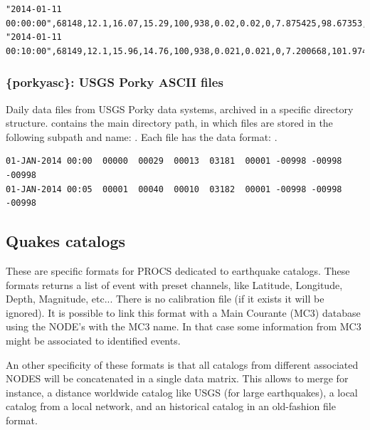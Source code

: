 \begin{lstlisting}[language={},title=Campbell T0A5 format example]
"2014-01-11 00:00:00",68148,12.1,16.07,15.29,100,938,0.02,0.02,0,7.875425,98.67353,10.86884,0,0,0,0,0,0,0,0
"2014-01-11 00:10:00",68149,12.1,15.96,14.76,100,938,0.021,0.021,0,7.200668,101.9742,11.35311,0,0,0,0,0,0,0,0
\end{lstlisting}


\subsubsection{\{porkyasc\}: USGS Porky ASCII files}

Daily data files from USGS Porky data systems, archived in a specific directory structure.  contains the main directory path, in which files are stored in the following subpath and name: . Each file has the data format: .

\begin{lstlisting}[language={},title=USGS Porky format example]
01-JAN-2014 00:00  00000  00029  00013  03181  00001 -00998 -00998 -00998
01-JAN-2014 00:05  00001  00040  00010  03182  00001 -00998 -00998 -00998
\end{lstlisting}

\subsection{Quakes catalogs}

These are specific formats for PROCS dedicated to earthquake catalogs. These formats returns a list of event with preset channels, like Latitude, Longitude, Depth, Magnitude, etc... There is no calibration file (if it exists it will be ignored). It is possible to link this format with a Main Courante (MC3) database using the NODE's  with the MC3 name. In that case some information from MC3 might be associated to identified events.

An other specificity of these formats is that all catalogs from different associated NODES will be concatenated in a single data matrix. This allows to merge for instance, a distance worldwide catalog like USGS (for large earthquakes), a local catalog from a local network, and an historical catalog in an old-fashion file format.

